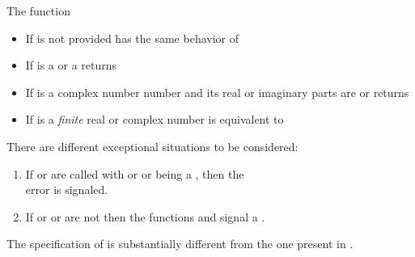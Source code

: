 \documentclass[../Comparisons-Predicates.tex]{subfiles}
\begin{document}
The function 
\begin{itemize}
\item If  is not provided has the same behavior of
\item If  is a  or a
   returns\\
   
\item If  is a complex number number and its real or
  imaginary parts are  or
   returns
   
\item If  is a \emph{finite} real or complex number is
  equivalent to  
  \code{)}
\end{itemize}

\DExceptional{}

There are different exceptional situations to be considered:
\begin{enumerate}
\item If  or  are called with
   or  or  being a
  , then the\\
   error is signaled.
\item If  or  or  are not \CL{}
   then the functions  and 
  signal a .
\end{enumerate}

% 


\DNotes{}

The specification of  is substantially different from the
one present in \cite{1994:ANSICL}.
\end{document}

